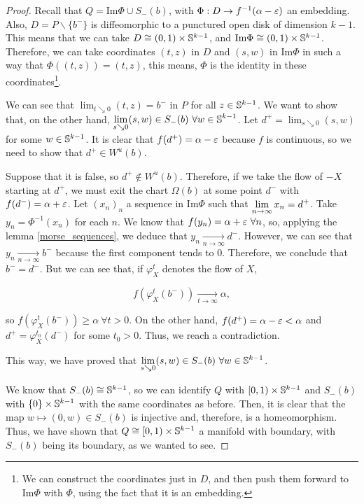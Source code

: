 \begin{proof}
Recall that $Q = \text{Im}\Phi \cup S_-(b)$, with $\Phi : D \rightarrow f^{-1}(\alpha-\varepsilon)$ an embedding. Also, $D = P \backslash \{b^-\}$ is diffeomorphic to a punctured open disk of dimension $k-1$. This means that we can take $D \cong (0,1) \times \mathbb{S}^{k-1}$, and $\text{Im} \Phi \cong (0,1) \times \mathbb{S}^{k-1}$. Therefore, we can take coordinates $(t,z)$ in $D$ and $(s,w)$ in $\text{Im} \Phi$ in such a way that $\Phi((t,z)) = (t,z)$, this means, $\Phi$ is the identity in these coordinates\footnote{We can construct the coordinates just in $D$, and then push them forward to $\text{Im}\Phi$ with $\Phi$, using the fact that it is an embedding.}.

We can see that $\displaystyle\lim_{t \searrow 0} (t,z) = b^-$ in $P$ for all $z \in \mathbb{S}^{k-1}$. We want to show that, on the other hand, $\displaystyle\lim_{s \searrow 0} (s,w) \in S_-(b) \ \forall w \in \con{S}^{k-1}$. Let $d^+ = \displaystyle\lim_{s \searrow 0} (s,w)$ for some $w \in \mathbb{S}^{k-1}$. It is clear that $f(d^+) = \alpha - \varepsilon$ because $f$ is continuous, so we need to show that $d^+ \in W^u(b)$.

Suppose that it is false, so $d^+ \notin W^u(b)$. Therefore, if we take the flow of $- X$ starting at $d^+$, we must exit the chart $\Omega(b)$ at some point $d^-$ with $f(d^-) = \alpha + \varepsilon$. Let $(x_n)_n$ a sequence in $\text{Im}\Phi$ such that $\displaystyle\lim_{n \rightarrow \infty} x_n = d^+$. Take $y_n = \Phi^{-1}(x_n)$ for each $n$. We know that $f(y_n) = \alpha + \varepsilon \ \forall n$, so, applying the lemma \ref{morse_sequences}, we deduce that $y_n \xrightarrow[n \rightarrow \infty]{} d^-$. However, we can see that $y_n \xrightarrow[n \rightarrow \infty]{} b^-$ because the first component tends to $0$. Therefore, we conclude that $b^- = d^-$. But we can see that, if $\varphi_X^t$ denotes the flow of $X$,

$$f(\varphi_X^t(b^-)) \xrightarrow[t \rightarrow \infty]{} \alpha ,$$

so $f(\varphi_X^t(b^-)) \geq \alpha \ \forall t > 0$. On the other hand, $f(d^+) = \alpha - \varepsilon < \alpha$ and $d^+ = \varphi_X^{t_0}(d^-)$ for some $t_0 > 0$. Thus, we reach a contradiction.

This way, we have proved that $\displaystyle\lim_{s \searrow 0} (s,w) \in S_-(b) \ \forall w \in \con{S}^{k-1}$.

We know that $S_-(b) \cong \mathbb{S}^{k-1}$, so we can identify $Q$ with $[0,1) \times \mathbb{S}^{k-1}$ and $S_-(b)$ with $\{0\} \times \mathbb{S}^{k-1}$ with the same coordinates as before. Then, it is clear that the map $w \mapsto (0,w) \in S_-(b)$ is injective and, therefore, is a homeomorphism. Thus, we have shown that $Q \cong [0,1) \times \mathbb{S}^{k-1}$ a manifold with boundary, with $S_-(b)$ being its boundary, as we wanted to see. 
\end{proof}
